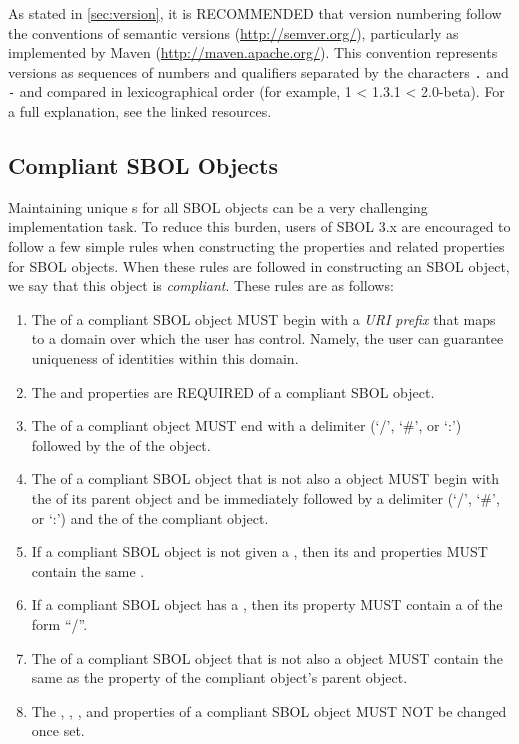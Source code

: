 As stated in \ref{sec:version},  it is RECOMMENDED that version numbering follow
the conventions of semantic versions (\url{http://semver.org/}), particularly as implemented by Maven (\url{http://maven.apache.org/}).
This convention represents versions as sequences of numbers and qualifiers separated by the characters {\tt .} and {\tt -} and compared in lexicographical order (for example, 1 < 1.3.1 < 2.0-beta).  For a full explanation, see the linked resources.

\subsection{Compliant SBOL Objects}
\label{sec:compliant}

Maintaining unique  s for all SBOL objects can be a very challenging implementation task.  To reduce this burden, users of SBOL 3.x are encouraged to follow a few simple rules when constructing the  properties and related properties for SBOL objects.  When these rules are followed in constructing an SBOL object, we say that this object is \emph{compliant}. These rules are as follows:
\begin{enumerate}
\item The  of a compliant SBOL object MUST begin with a \emph{URI prefix} that maps to a domain over which the user has control. Namely, the user can guarantee uniqueness of identities within this domain.
\item The  and  properties are REQUIRED of a compliant SBOL object.
\item The  of a compliant  object MUST end with a delimiter (`/', `\#', or `:') followed by the  of the object. 
\item The  of a compliant SBOL object that is not also a  object MUST begin with the  of its parent object and be immediately followed by a delimiter (`/', `\#', or `:') and the  of the compliant object.
\item If a compliant SBOL object is not given a , then its  and  properties MUST contain the same .
\item If a compliant SBOL object has a , then its  property MUST contain a  of the form  ``/''.
\item The  of a compliant SBOL object that is not also a  object MUST contain the same  as the  property of the compliant object's parent object.
\item The , , , and  properties of a compliant SBOL object MUST NOT be changed once set.
\end{enumerate}

